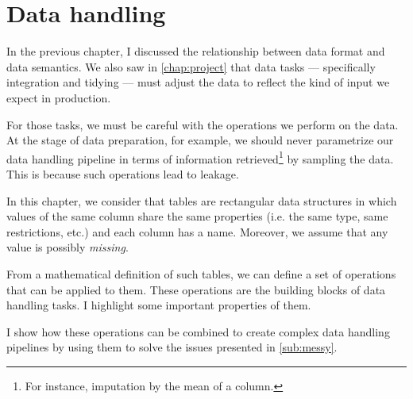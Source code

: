 \chapter{Data handling}
\label{chap:handling}



In the previous chapter, I discussed the relationship between data format and data
semantics.  We also saw in \cref{chap:project} that data tasks --- specifically
integration and tidying --- must adjust the data to reflect the kind of
input we expect in production.

For those tasks, we must be careful with the operations we perform on the data. At the
stage of data preparation, for example, we should never parametrize our data handling
pipeline in terms of information retrieved\footnote{For instance, imputation by the mean
of a column.} by sampling the data.  This is because such operations lead to \gls{leakage}.

In this chapter, we consider that tables are rectangular data structures in which values
of the same column share the same properties (i.e. the same type, same restrictions, etc.)
and each column has a name.  Moreover, we assume that any value is possibly
\emph{missing}.

From a mathematical definition of such tables, we can define a set of operations that can
be applied to them.  These operations are the building blocks of data handling tasks.
I highlight some important properties of them.

I show how these operations can be combined to create complex data handling pipelines by
using them to solve the issues presented in \cref{sub:messy}.

